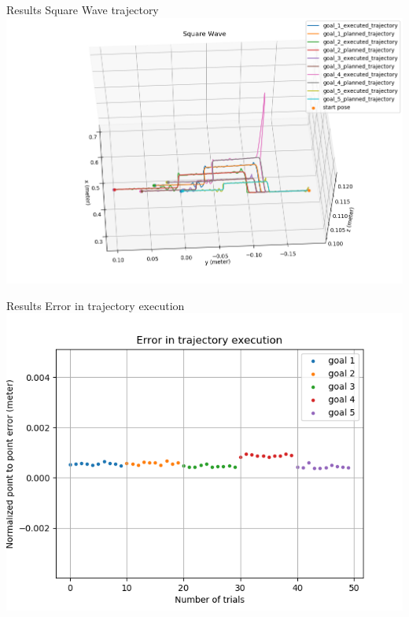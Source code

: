 \documentclass{beamer}
\begin{document}
	\begin{frame}{Results}
		\centering
		Square Wave trajectory
		\includegraphics[scale=0.4]{images/1/square.png}
	\end{frame}
	\begin{frame}{Results}
		\centering
		Error in trajectory execution
		\includegraphics[scale=0.4]{images/1/square_e.png}
	\end{frame}
		
\end{document}
